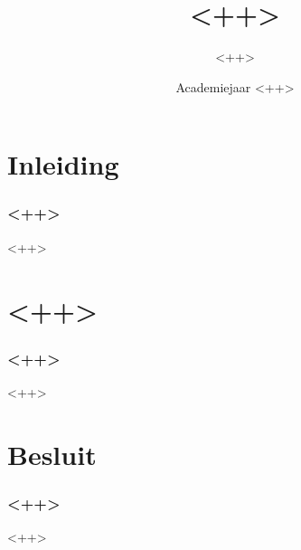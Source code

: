 \documentclass
   [kul] %
   {kulakbeamer}
\title[<++>]{<++>}
\author[<++>]{<++>}
\institute[Kul]{KU Leuven}
\date{Academiejaar <++>}
\begin{document}
\begin{titleframe}
\titlepage
\end{titleframe}

\begin{outlineframe}[Overzicht]
\tableofcontents
\end{outlineframe}


\section{Inleiding}

\begin{frame}
\frametitle{<++>}
    <++>
\end{frame}

\section[<++>]{<++>}

\begin{frame}
\frametitle{<++>}
    <++>
\end{frame}

\section{Besluit}
\begin{frame}
\frametitle{<++>}
    <++>
\end{frame}
\end{document}
